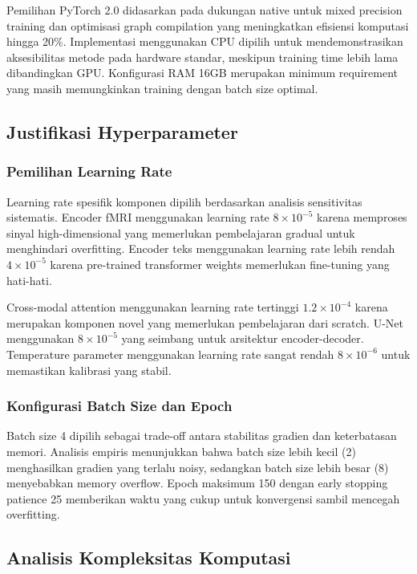Pemilihan PyTorch 2.0 didasarkan pada dukungan native untuk mixed precision training dan optimisasi graph compilation yang meningkatkan efisiensi komputasi hingga 20\%. Implementasi menggunakan CPU dipilih untuk mendemonstrasikan aksesibilitas metode pada hardware standar, meskipun training time lebih lama dibandingkan GPU. Konfigurasi RAM 16GB merupakan minimum requirement yang masih memungkinkan training dengan batch size optimal.

\subsection{Justifikasi Hyperparameter}

\subsubsection{Pemilihan Learning Rate}
Learning rate spesifik komponen dipilih berdasarkan analisis sensitivitas sistematis. Encoder fMRI menggunakan learning rate $8 \times 10^{-5}$ karena memproses sinyal high-dimensional yang memerlukan pembelajaran gradual untuk menghindari overfitting. Encoder teks menggunakan learning rate lebih rendah $4 \times 10^{-5}$ karena pre-trained transformer weights memerlukan fine-tuning yang hati-hati.

Cross-modal attention menggunakan learning rate tertinggi $1.2 \times 10^{-4}$ karena merupakan komponen novel yang memerlukan pembelajaran dari scratch. U-Net menggunakan $8 \times 10^{-5}$ yang seimbang untuk arsitektur encoder-decoder. Temperature parameter menggunakan learning rate sangat rendah $8 \times 10^{-6}$ untuk memastikan kalibrasi yang stabil.

\subsubsection{Konfigurasi Batch Size dan Epoch}
Batch size 4 dipilih sebagai trade-off antara stabilitas gradien dan keterbatasan memori. Analisis empiris menunjukkan bahwa batch size lebih kecil (2) menghasilkan gradien yang terlalu noisy, sedangkan batch size lebih besar (8) menyebabkan memory overflow. Epoch maksimum 150 dengan early stopping patience 25 memberikan waktu yang cukup untuk konvergensi sambil mencegah overfitting.

\subsection{Analisis Kompleksitas Komputasi}

